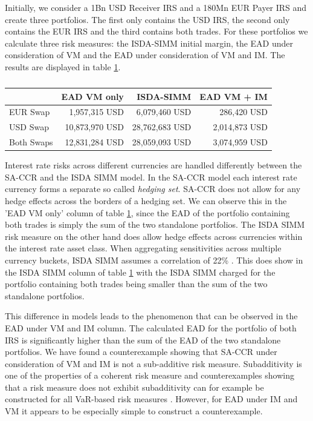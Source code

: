 \documentclass[../Thesis_AHoecherl.tex]{subfiles}
\begin{document}
    Initially, we consider a 1Bn USD Receiver IRS and a 180Mn EUR Payer IRS and create three portfolios. The first only contains the USD IRS, the second only contains the EUR IRS and the third contains both trades.
    For these portfolios we calculate three risk measures: the ISDA-SIMM initial margin, the EAD under consideration of VM and the EAD under consideration of VM and IM. The results are displayed in table \ref{tab:2TradeRatesResults}.

    \begin{table}[htbp]
        \centering
        \begin{tabular}{l||r|r|r}
                & EAD VM only &ISDA-SIMM & EAD VM + IM \\
                \toprule
        EUR Swap & 1,957,315 USD & 6,079,460 USD & 286,420 USD \\
        USD Swap & 10,873,970 USD & 28,762,683 USD & 2,014,873 USD \\
        Both Swaps & 12,831,284 USD & 28,059,093 USD & 3,074,959 USD \\
        \end{tabular}%
        \caption{}
        \label{tab:2TradeRatesResults}%
    \end{table}%

    Interest rate risks across different currencies are handled differently between the \gls{SA-CCR} and the \gls{ISDA SIMM} model.
    In the SA-CCR model each interest rate currency forms a separate so called \emph{hedging set}. SA-CCR does not allow for any hedge effects across the borders of a hedging set.
    We can observe this in the 'EAD VM only' column of table \ref{tab:2TradeRatesResults}, since the EAD of the portfolio containing both trades is simply the sum of the two standalone portfolios.
    The \gls{ISDA SIMM} risk measure on the other hand does allow hedge effects across currencies within the interest rate asset class. When aggregating sensitivities across multiple currency buckets, \gls{ISDA SIMM} assumes a correlation of 22\% \cite[Section D.2]{SIMM}.
    This does show in the \gls{ISDA SIMM} column of table \ref{tab:2TradeRatesResults} with the \gls{ISDA SIMM} charged for the portfolio containing both trades being smaller than the sum of the two standalone portfolios.
    
    This difference in models leads to the phenomenon that can be observed in the EAD under VM and IM column. The calculated EAD for the portfolio of both IRS is significantly higher than the sum of the EAD of the two standalone portfolios.
    We have found a counterexample showing that SA-CCR under consideration of VM and IM is not a sub-additive risk measure.
    Subadditivity is one of the properties of a coherent risk measure  and counterexamples showing that a risk measure does not exhibit subadditivity can for example be constructed for all VaR-based risk measures . However, for EAD under IM and VM it appears to be especially simple to construct a counterexample.
\end{document}
